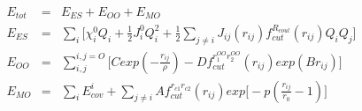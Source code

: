\documentclass[12pt]{article}
\begin{document}
\begin{eqnarray*}
E_{tot} & = & E_{ES} + E_{OO} + E_{MO} \\
E_{ES} & = & \sum_i{\Big[ \chi_{i}^{0}Q_i + \frac{1}{2}J_{i}^{0}Q_{i}^{2} +
 \frac{1}{2} \sum_{j\neq i}{ J_{ij}(r_{ij})f_{cut}^{R_{coul}}(r_{ij})Q_i Q_j } \Big] } \\
E_{OO} & = & \sum_{i,j}^{i,j = O}{\Bigg[Cexp( -\frac{r_{ij}}{\rho} ) - Df_{cut}^{r_1^{OO}r_2^{OO}}(r_{ij}) exp(Br_{ij})\Bigg]}  \\
E_{MO} & = & \sum_i{E_{cov}^{i} + \sum_{j\neq i}{ Af_{cut}^{r_{c1}r_{c2}}(r_{ij})exp\Big[-p(\frac{r_{ij}}{r_0} -1) \Big] } }  \\
\end{eqnarray*}
\end{document}
